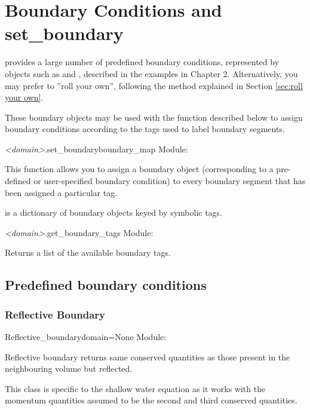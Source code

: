 \documentclass{manual}
\begin{document}

\chapter{Boundary Conditions and set_boundary}
\label{sec:boundary conditions}

\anuga provides a large number of predefined boundary conditions,
represented by objects such as  and
, described in the examples
in Chapter 2. Alternatively, you may prefer to ''roll your own'',
following the method explained in Section \ref{sec:roll your own}.

These boundary objects may be used with the function  described below
to assign boundary conditions according to the tags used to label boundary segments.

\begin{methoddesc}{\emph{<domain>}.set_boundary}{boundary_map}
Module: 

This function allows you to assign a boundary object (corresponding to a
pre-defined or user-specified boundary condition) to every boundary segment that
has been assigned a particular tag.

 is a dictionary of boundary objects keyed by symbolic tags.
\end{methoddesc}

\begin{methoddesc} {\emph{<domain>}.get_boundary_tags}{}
Module: 

Returns a list of the available boundary tags.
\end{methoddesc}

\section{Predefined boundary conditions}


\subsection{Reflective Boundary}


\begin{classdesc}{Reflective_boundary}{domain=None}
Module: 

Reflective boundary returns same conserved quantities as those present in
the neighbouring volume but reflected.

This class is specific to the shallow water equation as it works with the
momentum quantities assumed to be the second and third conserved quantities.
\end{classdesc}
\end{document}
